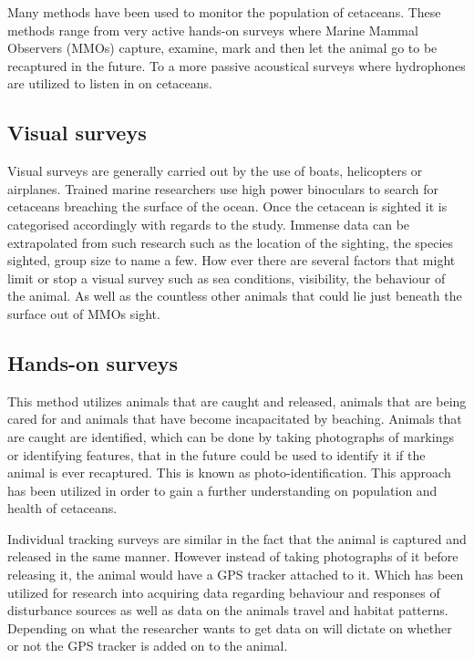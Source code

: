 Many methods have been used to monitor the population of cetaceans.
These methods range from very active hands-on surveys where Marine Mammal Observers (MMOs) capture, examine, mark and then let the animal go to be recaptured in the future.
To a more passive acoustical surveys where hydrophones are utilized to listen in on cetaceans.


\subsection{Visual surveys}%

Visual surveys are generally carried out by the use of  boats, helicopters or airplanes.
Trained marine researchers use high power binoculars to search for cetaceans breaching the surface of the ocean.
Once the cetacean is sighted it is categorised accordingly with regards to the study.
Immense data can be extrapolated from such research such as the location of the sighting, the species sighted, group size to name a few\cite{campbell_inter-annual_2015}.
How ever there are several factors that might limit or stop a visual survey such as sea conditions, visibility, the behaviour of the animal.
As well as the countless other animals that could lie just beneath the surface out of MMOs sight.

\subsection{Hands-on surveys}

This method utilizes animals that are caught and released, animals that are being cared for and animals that have become incapacitated by beaching. 
Animals that are caught are identified, which can be done by taking photographs of markings or identifying features, that in the future could be used to identify it if the animal is ever recaptured.
This is known as photo-identification\cite{booth_methods_2020}.
This approach has been utilized in order to gain a further understanding on population and health of cetaceans.

Individual tracking surveys are similar in the fact that the animal is captured and released in the same manner.
However instead of taking photographs of it before releasing it, the animal would have a GPS tracker attached to it. 
Which has been utilized for research into acquiring data regarding behaviour and responses of disturbance sources as well as data on the animals travel and habitat patterns. 
Depending on what the researcher wants to get data on will dictate on whether or not the GPS tracker is added on to the animal\cite{booth_methods_2020}.



